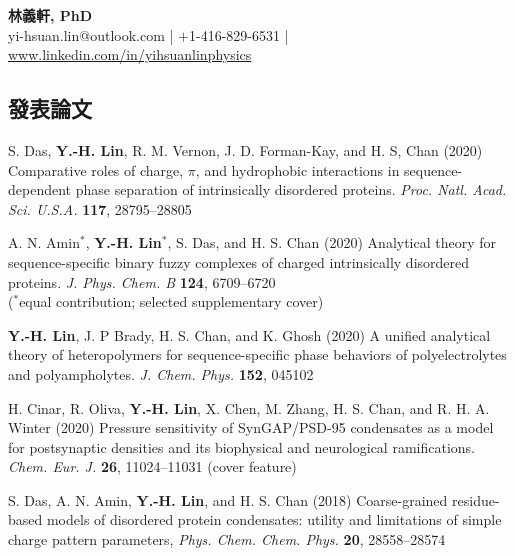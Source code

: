 \documentclass[11pt,letterpaper, sans]{article}
\makeatletter
\newcommand{\tname}[1]{{\bf #1}}%
\newcommand{\newsec}[1]{\subsection*{\hspace{-1.5pt}\Large\uppercase{\bf #1}}}
\def\name{林義軒, PhD}
\def\header{
\begin{center}
{\LARGE\bf \name} \vspace{0.3cm} \\
yi-hsuan.lin@outlook.com
| $+$1-416-829-6531 | 
\href{https://www.linkedin.com/in/yihsuanlinphysics/}{www.linkedin.com/in/yihsuanlinphysics}
\end{center}

}
\makeatother
\begin{document}
\header




\begin{flushleft}

\newsec{發表論文}

\begin{etaremune}[leftmargin=17pt]

\item S. Das, \tname{Y.-H. Lin}, R. M. Vernon, J. D. Forman-Kay, and H. S, Chan (2020)
Comparative roles of charge, $\pi$, and hydrophobic interactions in sequence-dependent phase separation of intrinsically disordered proteins. 
{\it Proc. Natl. Acad. Sci. U.S.A.} {\bf 117}, 28795--28805

\item 
A. N. Amin$^*$, \tname{Y.-H. Lin}$^*$, S. Das, and H. S. Chan (2020)
Analytical theory for sequence-specific binary fuzzy complexes of charged intrinsically disordered proteins.
{\it J. Phys. Chem. B} {\bf 124}, 6709--6720 \\
($^*$equal contribution; selected supplementary cover) 

\item
\tname{Y.-H. Lin}, J. P Brady, H. S. Chan, and K. Ghosh (2020)
A unified analytical theory of heteropolymers for sequence-specific phase behaviors of polyelectrolytes and polyampholytes. 
{\it J. Chem. Phys.} {\bf 152}, 045102

\item
H. Cinar, R. Oliva, \tname{Y.-H. Lin}, X. Chen, M. Zhang, H. S. Chan, and R. H. A. Winter (2020)
Pressure sensitivity of SynGAP/PSD-95 condensates as a model for postsynaptic densities and its biophysical and neurological ramifications. 
{\it Chem. Eur. J.} {\bf 26}, 11024--11031 (cover feature)

\item
S. Das, A. N. Amin, \tname{Y.-H. Lin}, and H. S. Chan (2018)
Coarse-grained residue-based models of disordered protein condensates: utility and limitations of simple charge pattern parameters, {\it Phys. Chem. Chem. Phys.} {\bf 20}, 28558--28574


\end{etaremune}
\end{flushleft}
\end{document}
